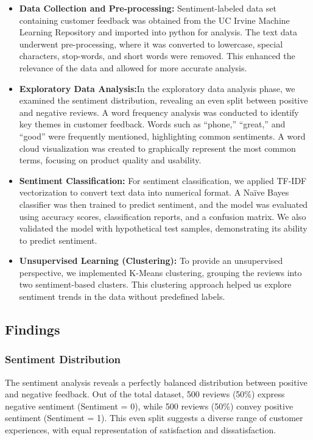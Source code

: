 \documentclass[preprint, 3p,
authoryear]{elsarticle} %
\begin{document}
\begin{itemize}
\item
  \textbf{Data Collection and Pre-processing:} Sentiment-labeled data
  set containing customer feedback was obtained from the UC Irvine
  Machine Learning Repository and imported into python for analysis. The
  text data underwent pre-processing, where it was converted to
  lowercase, special characters, stop-words, and short words were
  removed. This enhanced the relevance of the data and allowed for more
  accurate analysis.
\item
  \textbf{Exploratory Data Analysis:}In the exploratory data analysis
  phase, we examined the sentiment distribution, revealing an even split
  between positive and negative reviews. A word frequency analysis was
  conducted to identify key themes in customer feedback. Words such as
  ``phone,'' ``great,'' and ``good'' were frequently mentioned,
  highlighting common sentiments. A word cloud visualization was created
  to graphically represent the most common terms, focusing on product
  quality and usability.
\item
  \textbf{Sentiment Classification:} For sentiment classification, we
  applied TF-IDF vectorization to convert text data into numerical
  format. A Naïve Bayes classifier was then trained to predict
  sentiment, and the model was evaluated using accuracy scores,
  classification reports, and a confusion matrix. We also validated the
  model with hypothetical test samples, demonstrating its ability to
  predict sentiment.
\item
  \textbf{Unsupervised Learning (Clustering):} To provide an
  unsupervised perspective, we implemented K-Means clustering, grouping
  the reviews into two sentiment-based clusters. This clustering
  approach helped us explore sentiment trends in the data without
  predefined labels.
\end{itemize}

\subsection{Findings}\label{findings}

\subsubsection{Sentiment Distribution}\label{sentiment-distribution}

The sentiment analysis reveals a perfectly balanced distribution between
positive and negative feedback. Out of the total dataset, 500 reviews
(50\%) express negative sentiment (Sentiment = 0), while 500 reviews
(50\%) convey positive sentiment (Sentiment = 1). This even split
suggests a diverse range of customer experiences, with equal
representation of satisfaction and dissatisfaction.
\end{document}
